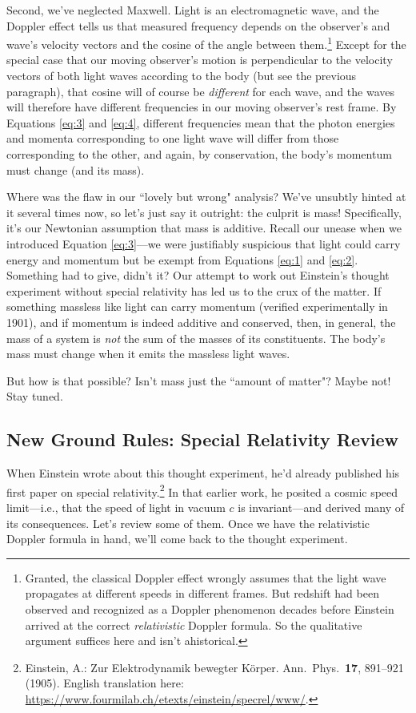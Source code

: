 \documentclass[12pt]{article}
\begin{document}
Second, we've neglected Maxwell. Light is an electromagnetic wave, and the Doppler effect tells us that measured frequency depends on the observer's and wave's velocity vectors and the cosine of the angle between them.\footnote{Granted, the classical Doppler effect wrongly assumes that the light wave propagates at different speeds in different frames. But redshift had been observed and recognized as a Doppler phenomenon decades before Einstein arrived at the correct \emph{relativistic} Doppler formula. So the qualitative argument suffices here and isn't ahistorical.} Except for the special case that our moving observer's motion is perpendicular to the velocity vectors of both light waves according to the body (but see the previous paragraph), that cosine will of course be \emph{different} for each wave, and the waves will therefore have different frequencies in our moving observer's rest frame. By Equations \ref{eq:3} and \ref{eq:4}, different frequencies mean that the photon energies and momenta corresponding to one light wave will differ from those corresponding to the other, and again, by conservation, the body's momentum must change (and its mass\textinterrobang).

Where was the flaw in our ``lovely but wrong" analysis? We've unsubtly hinted at it several times now, so let's just say it outright: the culprit is mass! Specifically, it's our Newtonian assumption that mass is additive. Recall our unease when we introduced Equation \ref{eq:3}---we were justifiably suspicious that light could carry energy and momentum but be exempt from Equations \ref{eq:1} and \ref{eq:2}. Something had to give, didn't it? Our attempt to work out Einstein's thought experiment without special relativity has led us to the crux of the matter. If something massless like light can carry momentum (verified experimentally in 1901), and if momentum is indeed additive and conserved, then, in general, the mass of a system is \emph{not} the sum of the masses of its constituents. The body's mass must change when it emits the massless light waves.

But how is that possible? Isn't mass just the ``amount of matter"? Maybe not! Stay tuned.



\subsection{New Ground Rules: Special Relativity Review}\label{ssec:sr}

When Einstein wrote about this thought experiment, he'd already published his first paper on special relativity.\footnote{\label{fn:ep}Einstein, A.: Zur Elektrodynamik bewegter K\"orper. Ann.\ Phys.\ \textbf{17}, 891--921 (1905). English translation here: \url{https://www.fourmilab.ch/etexts/einstein/specrel/www/}.} In that earlier work, he posited a cosmic speed limit---i.e., that the speed of light in vacuum $c$ is invariant---and derived many of its consequences. Let's review some of them. Once we have the relativistic Doppler formula in hand, we'll come back to the thought experiment.
\end{document}
